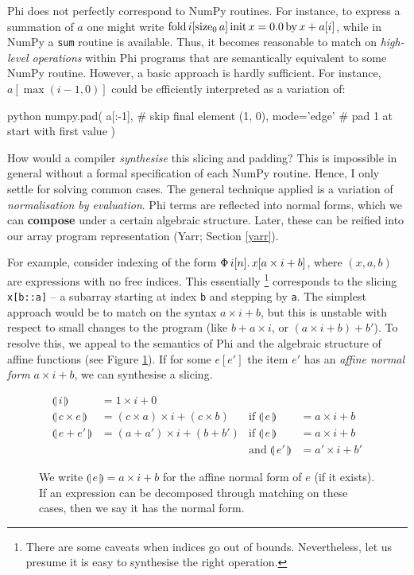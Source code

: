 Phi does not perfectly correspond to NumPy routines. For instance, to express a summation of $a$ one might write $\phifold{i}{\phisize{a}{0}}{x}{0.0}{x + a[i]}$, while in NumPy a \texttt{sum} routine is available. Thus, it becomes reasonable to match on \textit{high-level operations} within Phi programs that are semantically equivalent to some NumPy routine. However, a basic approach is hardly sufficient. For instance, $a[\max(i - 1, 0)]$ could be efficiently interpreted as a variation of:
\begin{center}
\begin{cminted}{python}
numpy.pad(
    a[:-1],               # skip final element
    (1, 0), mode='edge'   # pad 1 at start with first value
)
\end{cminted}
\end{center}
How would a compiler \textit{synthesise} this slicing and padding? 
This is impossible in general without a formal specification of each NumPy routine. Hence, I only settle for solving common cases.
The general technique applied is a variation of \textit{normalisation by evaluation}. Phi terms are reflected into normal forms, which we can \textbf{compose} under a certain algebraic structure. Later, these can be reified into our array program representation (Yarr; Section \ref{yarr}).

For example, consider indexing of the form $\phivec{i}{n}{x[a \times i + b]}$, where $(x, a, b)$ are expressions with no free indices. This essentially%
\footnote{
There are some caveats when indices go out of bounds. Nevertheless, let us presume it is easy to synthesise the right operation.}
corresponds to the slicing \texttt{x[b::a]} -- a subarray starting at index \texttt{b} and stepping by \texttt{a}.
The simplest approach would be to match on the syntax $a \times i + b$, but this is unstable with respect to small changes to the program (like $b + a \times i$, or $(a \times i + b) + b'$).
To resolve this, we appeal to the semantics of Phi and the algebraic structure of affine functions (see Figure \ref{fig:affine-normal-forms}). 
If for some $e[e']$ the item $e'$ has an \textit{affine normal form} $a \times i + b$, we can synthesise a slicing.

\newcommand{\norma}[1]{\llparenthesis \,{#1}\, \rrparenthesis}
\begin{figure}
    \centering
\begin{align*}
\norma{i} &= 1 \times i + 0 \\
\norma{c\times e} &= (c \times a) \times i + (c \times b)
& \text{if } \norma{e} &= a \times i + b \\
\norma{e + e'} &= (a + a') \times i + (b + b')
& \text{if } \norma{e} &= a \times i + b \\
&& \text{and } \norma{e'} &= a' \times i + b'
\end{align*}
    \caption{We write $\norma{e} = a \times i + b$ for the affine normal form of $e$ (if it exists). If an expression can be decomposed through matching on these cases, then we say it has the normal form.}
    \label{fig:affine-normal-forms}
\end{figure}


